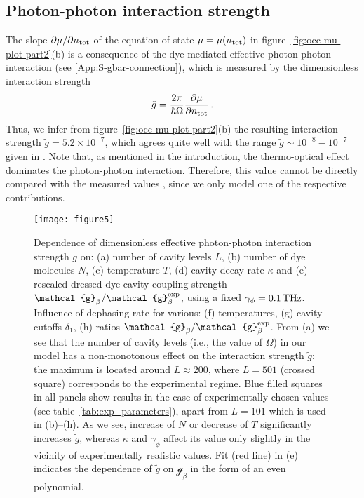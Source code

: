 \documentclass[12pt, a4paper]{iopart}
\begin{document}
\subsection{Photon-photon interaction strength}

The slope $\partial \mu / \partial n_{\rm tot}$ of the equation of state $\mu=\mu(n_{\rm tot})$ in figure~\ref{fig:occ-mu-plot-part2}(b) is a consequence of the dye-mediated effective photon-photon interaction (see \ref{App:S-gbar-connection}), which is measured by the dimensionless interaction strength
%
\begin{equation}
\label{eq:gbar-slope-connection}
\tilde{g} = \frac{2\pi}{\hbar \Omega}\frac{\partial \mu}{\partial n_{\rm tot}}\,.
\end{equation}
%
Thus, we infer from figure~\ref{fig:occ-mu-plot-part2}(b) the resulting interaction strength $\tilde{g} = 5.2 \times 10^{-7}$, which agrees quite well with the range $\tilde{g}\sim 10^{-8}-10^{-7}$ given in \cite{StoofPRL-Interaction}. Note that, as mentioned in the introduction, the thermo-optical effect dominates the photon-photon interaction. Therefore, this value cannot be directly compared with the measured values \cite{Klaers_BEC_of_photons,NymanStrength,Oosten}, since we only model one of the respective contributions.

\begin{figure}[!t]
\centering
\texttt{[image: figure5]}
\caption{
{Dependence of dimensionless effective photon-photon interaction strength $\tilde{g}$ on: (a) number of cavity levels $L$, (b) number of dye molecules $N$, (c) temperature $T$, (d) cavity decay rate $\kappa$ and (e) rescaled dressed dye-cavity coupling strength $\mathcal{g}_\beta/\mathcal{g}_\beta^{\rm exp}$, using a fixed $\gamma_\phi=0.1\,{\rm THz}$. Influence of dephasing rate for various: (f) temperatures, (g) cavity cutoffs $\delta_1$, (h) ratios $\mathcal{g}_\beta/\mathcal{g}_\beta^{\rm exp}$. From (a) we see that the number of cavity levels (i.e., the value of $\Omega$) in our model has a non-monotonous effect on the interaction strength $\tilde{g}$: the maximum is located around $L\approx 200$, where $L=501$ (crossed square) corresponds to the experimental regime. Blue filled squares in all panels show results in the case of experimentally chosen values (see table~\ref{tab:exp_parameters}), apart from $L=101$ which is used in (b)--(h). As we see, increase of $N$ or decrease of $T$ significantly increases $\tilde{g}$, whereas $\kappa$ and $\gamma_\phi$ affect its value only slightly in the vicinity of experimentally realistic values. Fit (red line) in (e) indicates the dependence of $\tilde{g}$ on $\mathcal{g}_\beta$ in the form of an even polynomial.}}\label{fig:gbar-depend}
\end{figure}
\end{document}
